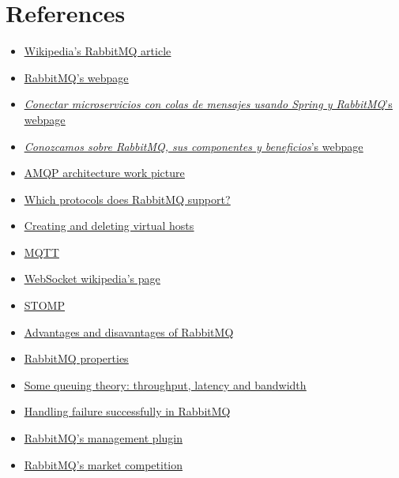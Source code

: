\documentclass[12pt]{article}
\begin{document}
\section*{References}
\begin{itemize}
    \item \href{https://en.wikipedia.org/wiki/RabbitMQ}{\underline{Wikipedia's RabbitMQ article}}
    \item \href{https://www.rabbitmq.com}{\underline{RabbitMQ's webpage}}
    \item \href{https://www.sdos.es/blog/microservicios-mensajes-spring-rabbitmq}{\underline{\textit{Conectar microservicios con colas de mensajes usando Spring y RabbitMQ}'s webpage}}
    \item \href{https://www.pragma.com.co/academia/lecciones/conozcamos-sobre-rabbitmq-sus-componentes-y-beneficios}{\underline{\textit{Conozcamos sobre RabbitMQ, sus componentes y beneficios}'s webpage}}
    \item \href{https://www.researchgate.net/publication/325119432/figure/fig5/AS:626093459505153@1526283721309/AMQP-architecture-34.png}{\underline{AMQP architecture work picture}}
    \item \href{https://www.rabbitmq.com/protocols.html}{\underline{Which protocols does RabbitMQ support?}}
    \item \href{https://www.rabbitmq.com/vhosts.html}{\underline{Creating and deleting virtual hosts}}
    \item \href{https://www.luisllamas.es/que-es-mqtt-su-importancia-como-protocolo-iot/}{\underline{MQTT}}
    \item \href{https://en.wikipedia.org/wiki/WebSocket}{\underline{WebSocket wikipedia's page}}
    \item \href{http://stomp.github.io}{\underline{STOMP}}
    \item \href{https://programmerclick.com/article/80671335987/}{\underline{Advantages and disavantages of RabbitMQ}}
    \item \href{https://blog.devgenius.io/scalable-system-implementation-using-rabbitmq-java-and-mysql-2d5fe0fa182e}{\underline{RabbitMQ properties}}
    \item \href{https://blog.rabbitmq.com/posts/2012/05/some-queuing-theory-throughput-latency-and-bandwidth/}{\underline{Some queuing theory: throughput, latency and bandwidth}}
    \item \href{https://medium.com/codait/handling-failure-successfully-in-rabbitmq-22ffa982b60f}{\underline{Handling failure successfully in RabbitMQ}}
    \item \href{https://www.rabbitmq.com/management.html}{\underline{RabbitMQ's management plugin}}
    \item \href{https://geekflare.com/es/top-message-brokers/}{\underline{RabbitMQ's market competition}}
    \end{itemize}
\end{document}
